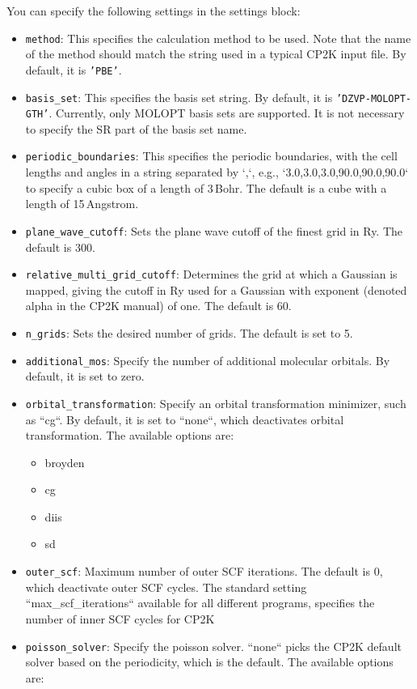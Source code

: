 \documentclass[]{tufte-book}
\begin{document}
You can specify the following settings in the settings block:
\begin{itemize}
	\item \texttt{method}: This specifies the calculation method to be used.
	Note that the name of the method should match the string used in a typical \textsc{CP2K} input file.
	By default, it is \texttt{'PBE'}.
	\item \texttt{basis\_set}: This specifies the basis set string. By default, it is \texttt{'DZVP-MOLOPT-GTH'}. Currently, only MOLOPT basis sets are supported. It is not necessary to specify the SR part of the basis set name.
	\item \texttt{periodic\_boundaries}: This specifies the periodic boundaries, with the cell lengths and angles in a string separated by `,`, e.g., `3.0,3.0,3.0,90.0,90.0,90.0` to specify a cubic box of a length of 3\,Bohr. The default is a cube with a length of 15\,Angstrom.
	\item \texttt{plane\_wave\_cutoff}: Sets the plane wave cutoff of the finest grid in Ry. The default is 300.
	\item \texttt{relative\_multi\_grid\_cutoff}: Determines the grid at which a Gaussian is mapped, giving the cutoff in Ry used for a Gaussian with exponent (denoted alpha in the \textsc{CP2K} manual) of one. The default is 60.
	\item \texttt{n\_grids}: Sets the desired number of grids. The default is set to 5.
	\item \texttt{additional\_mos}: Specify the number of additional molecular orbitals. By default, it is set to zero.
	\item \texttt{orbital\_transformation}: Specify an orbital transformation minimizer, such as ``cg``. By default, it is set to ``none``, which deactivates orbital transformation. The available options are:
        \begin{itemize}
		\item broyden
		\item cg
		\item diis
		\item sd
        \end{itemize}
	\item \texttt{outer\_scf}: Maximum number of outer SCF iterations. The default is 0, which deactivate outer SCF cycles. The standard setting ``max\_scf\_iterations`` available for all different programs, specifies the number of inner SCF cycles for \textsc{CP2K}
	\item \texttt{poisson\_solver}: Specify the poisson solver. ``none`` picks the \textsc{CP2K} default solver based on the periodicity, which is the default. The available options are:

\end{itemize}
\end{document}
